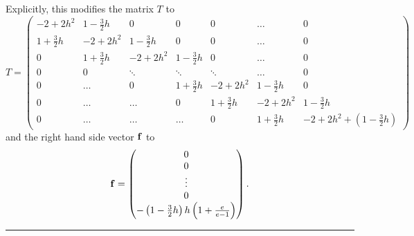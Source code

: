 \documentclass[10pt]{article}
\begin{document}
\begin{enumerate}
  Explicitly, this modifies the matrix $T$ to
  \begin{equation*}
    T =
    \begin{pmatrix}
      -2 + 2 h^2 & 1 - \tfrac{3}{2} h & 0 & 0 & 0 & \dots & 0 \\
      1 + \tfrac{3}{2} h & -2 + 2 h^2 & 1 - \tfrac{3}{2} h & 0 & 0 & \dots
      & 0 \\
      0 & 1 + \tfrac{3}{2} h & -2 + 2 h^2 & 1 - \tfrac{3}{2} h & 0 & \dots
      & 0 \\
      0 & 0 & \ddots & \ddots & \ddots & \dots & 0 \\
      0 & \dots & 0 & 1 + \tfrac{3}{2} h & -2 + 2 h^2 & 1 - \tfrac{3}{2} h
      & 0 \\
      0 & \dots & \dots & 0 & 1 + \tfrac{3}{2} h & -2 + 2 h^2 & 1 - \tfrac{3}{2}
      h \\
      0 & \dots & \dots & \dots & 0 & 1 + \tfrac{3}{2} h & -2 + 2 h^2 +
      \left(1 - \tfrac{3}{2} h \right)
    \end{pmatrix}
  \end{equation*}
  and the right hand side vector ${\bf f}$ to
  \begin{equation*}
    {\bf f}  =
    \begin{pmatrix}
      0 \\
      0 \\
      \vdots \\
      0 \\
      - \left( 1 - \tfrac{3}{2} h \right) h \left( 1 + \frac{e}{e-1}
        \right)
    \end{pmatrix}.
  \end{equation*}
  \begin{center}
    \rule{0.9\textwidth}{.1pt}
  \end{center}
\end{enumerate}
\end{document}
